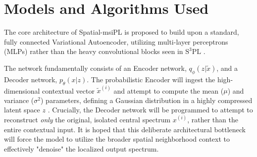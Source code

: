 \documentclass[
12pt, %
oneside, %
english, %
onehalfspacing, %
nolistspacing, %
headsepline, %
]{MastersDoctoralThesis} %
\begin{document}

\section{Models and Algorithms Used}
The core architecture of Spatial-msiPL is proposed to build upon a standard, fully connected Variational Autoencoder, utilizing multi-layer perceptrons (MLPs) \citep{abdelmoula2021peak} rather than the heavy convolutional blocks seen in $\text{S}^{3}\text{PL}$ \citep{weigand2026spatial}.

The network fundamentally consists of an Encoder network, $q_\phi(z|\tilde{x})$, and a Decoder network, $p_\theta(x|z)$.
The probabilistic Encoder will ingest the high-dimensional contextual vector $\tilde{x}^{(i)}$ and attempt to compute the mean ($\mu$) and variance ($\sigma^2$) parameters, defining a Gaussian distribution in a highly compressed latent space $z$ \citep{abdelmoula2021peak}.
Crucially, the Decoder network will be programmed to attempt to reconstruct \textit{only} the original, isolated central spectrum $x^{(i)}$, rather than the entire contextual input. It is hoped that this deliberate architectural bottleneck will force the model to utilize the broader spatial neighborhood context to effectively "denoise" the localized output spectrum.
\end{document}
